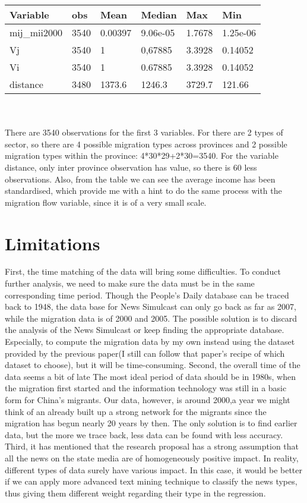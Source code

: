 \documentclass{article}
\begin{document}
\begin{table}[H]
\centering
\captionsetup{labelfont=bf}
\label{tab:title}
\begin{tabular}{llllll}
  \hline
  Variable  & obs & Mean & Median  & Max & Min \\ 
  \hline
  mij\_mii2000 & 3540 & 0.00397 & 9.06e-05 & 1.7678 & 1.25e-06\\
  Vj & 3540 & 1 & 0,67885 & 3.3928  & 0.14052\\
  Vi & 3540 & 1 & 0.67885 & 3.3928 & 0.14052\\
  distance & 3480 & 1373.6 & 1246.3 &3729.7 &121.66 \\
   \hline
\end{tabular}
\end{table}
\\~\\
There are 3540 observations for the first 3 variables. For there are 2 types of sector, so there are 4 possible migration types across provinces and 2 possible migration types within the province: 4*30*29+2*30=3540. For the variable distance, only inter province observation has value, so there is 60 less observations. Also, from the table we can see the average income has been standardised, which provide me with a hint to do the same process with the migration flow variable, since it is of a very small scale.


\section{Limitations}
First, the time matching of the data will bring some difficulties. To conduct further analysis, we need to make sure the data must be in the same corresponding time period. Though the People's Daily database can be traced back to 1948, the data base for News Simulcast can only go back as far as 2007, while the migration data is of 2000 and 2005. The possible solution is to discard the analysis of the News Simulcast or keep finding the appropriate database. Especially, to compute the migration data by my own instead using the dataset provided by the previous paper(I still can follow that paper's recipe of which dataset to choose), but it will be time-consuming. Second, the overall time of the data seems a bit of late The most ideal period of data should be in 1980s, when the migration first started and the information technology was still in a basic form for China's migrants. Our data, however, is around 2000,a year we might think of an already built up a strong network for the migrants since the migration has begun nearly 20 years by then. The only solution is to find earlier data, but the more we trace back, less data can be found with less accuracy. Third, it has mentioned that the research proposal has a strong assumption that all the news on the state media are of homogeneously positive impact. In reality, different types of data surely have various impact. In this case, it would be better if we can apply more advanced text mining technique to classify the news types, thus giving them different weight regarding their type in the regression.
\end{document}

